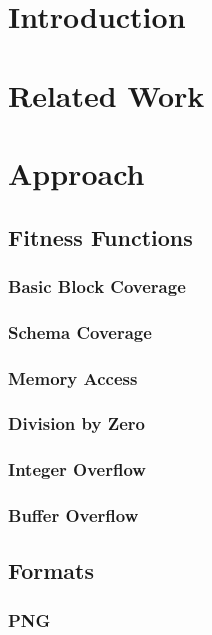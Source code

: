 \documentclass[a4paper]{scrartcl}
\begin{document}

\newpage

\newpage

\newpage

\newpage
\tableofcontents
\newpage
\section{Introduction}
\section{Related Work}
\section{Approach}



\subsection{Fitness Functions}
\subsubsection{Basic Block Coverage}
\subsubsection{Schema Coverage}
\subsubsection{Memory Access}
\subsubsection{Division by Zero}
\subsubsection{Integer Overflow}
\subsubsection{Buffer Overflow}
\subsection{Formats}
\subsubsection{PNG}
\end{document}
